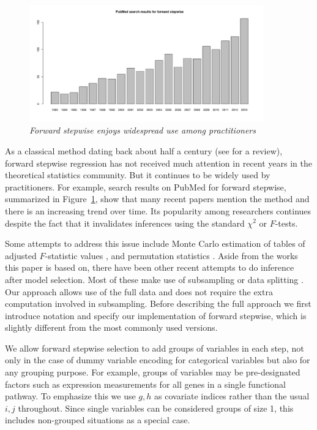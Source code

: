 \documentclass{imsart}
\begin{document}
\begin{figure}
\begin{center}
\includegraphics[width=0.9\textwidth]{../figs/pubmed.pdf}
\caption{\small \it Forward stepwise enjoys widespread use among
practitioners}
\label{fig:pubmed}
\end{center}
\end{figure}


As a classical method dating back about half a century
(see \cite{classical:selection} for a review),
forward stepwise regression has not received much attention in
recent years in the theoretical statistics community. But it continues
to be widely used by practitioners.
For example, search results on PubMed for forward stepwise,
summarized in Figure~\ref{fig:pubmed}, show that many recent
papers mention the method and there is an increasing trend over time.
Its popularity among researchers continues despite the fact that it
invalidates inferences using the standard $\chi^2$ or $F$-tests.


Some attempts to address this issue include Monte Carlo
estimation of tables of adjusted $F$-statistic values \citep{mc:ftoenter},
and permutation statistics \citep{permutation:stop}. Aside from the works
this paper is based on, there have been other recent attempts to do
inference after model selection. Most of these make use of subsampling
\citep{meinshausen:buhlmann} or data splitting \citep{wasserman:roeder}.
Our approach allows use of the full data and does not require the
extra computation involved in subsampling.
Before describing the full approach we first introduce notation and
specify our implementation of forward stepwise, which is slightly
different from the most commonly used versions.


We allow forward stepwise selection to add groups of variables in each
step, not only in the case of dummy variable encoding for categorical
variables but also for any grouping purpose. For example, groups of
variables may be pre-designated factors such as expression
measurements for all genes in a single functional pathway.
To emphasize this we use $g, h$ as covariate indices rather than the usual
$i, j$ throughout. Since single variables can be considered groups of
size 1, this includes non-grouped situations as a special
case.
\end{document}
